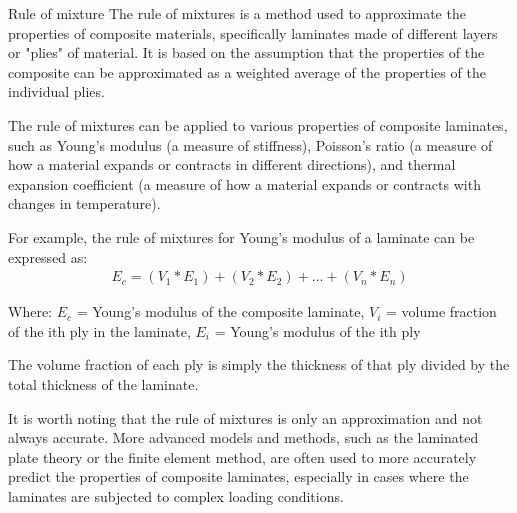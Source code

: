 \documentclass[10pt,aspectratio=169,dvipsnames]{beamer} %
\begin{document}
	\begin{frame}{Rule of mixture}
		\justifying\footnotesize
		The rule of mixtures is a method used to approximate the properties of composite materials, specifically laminates made of different layers or "plies" of material. It is based on the assumption that the properties of the composite can be approximated as a weighted average of the properties of the individual plies.
		
		The rule of mixtures can be applied to various properties of composite laminates, such as Young's modulus (a measure of stiffness), Poisson's ratio (a measure of how a material expands or contracts in different directions), and thermal expansion coefficient (a measure of how a material expands or contracts with changes in temperature).
		
		For example, the rule of mixtures for Young's modulus of a laminate can be expressed as:
		\begin{gather*}
			E_c = (V_1 * E_1) + (V_2 * E_2) + ... + (V_n * E_n)
		\end{gather*}
		
		Where:
		\(E_c\) = Young's modulus of the composite laminate, \(V_i\) = volume fraction of the ith ply in the laminate, \(E_i\) = Young's modulus of the ith ply
		
		The volume fraction of each ply is simply the thickness of that ply divided by the total thickness of the laminate.
		
		It is worth noting that the rule of mixtures is only an approximation and not always accurate. More advanced models and methods, such as the laminated plate theory or the finite element method, are often used to more accurately predict the properties of composite laminates, especially in cases where the laminates are subjected to complex loading conditions.	
	\end{frame}
\end{document}

